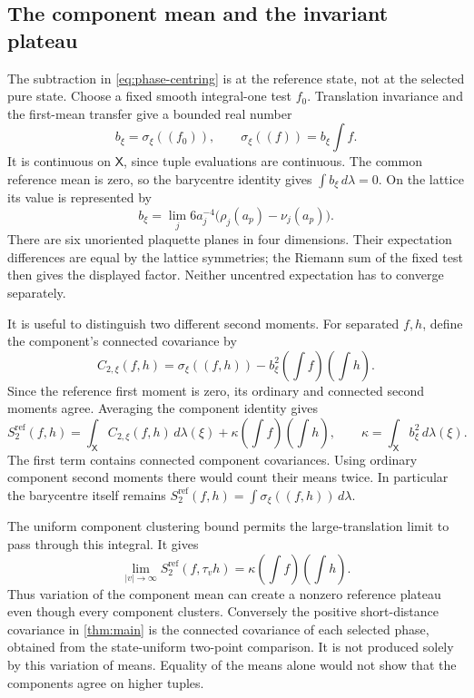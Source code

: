 \documentclass[11pt,letterpaper,reqno]{amsart}
\theoremstyle{definition}
\theoremstyle{remark}
\begin{document}
\subsection{The component mean and the invariant plateau}

The subtraction in \eqref{eq:phase-centring} is at the reference
state, not at the selected pure state. Choose a fixed smooth
integral-one test $f_0$. Translation invariance and the first-mean
transfer give a bounded real number
\[
 b_\xi=\sigma_\xi((f_0)),\qquad
 \sigma_\xi((f))=b_\xi\int f.
\]
It is continuous on $\mathsf X$, since tuple evaluations are
continuous. The common reference mean is zero, so the barycentre
identity gives $\int b_\xi\,d\lambda=0$. On the lattice its value
is represented by
\[
 b_\xi=\lim_j6a_j^{-4}
                  \big(\rho_j(a_p)-\nu_j(a_p)\big).
\]
There are six unoriented plaquette planes in four dimensions. Their
expectation differences are equal by the lattice symmetries; the
Riemann sum of the fixed test then gives the displayed factor.
Neither uncentred expectation has to converge separately.

It is useful to distinguish two different second moments. For
separated $f,h$, define the component's connected covariance by
\[
 C_{2,\xi}(f,h)=\sigma_\xi((f,h))
                      -b_\xi^2\left(\int f\right)\left(\int h\right).
\]
Since the reference first moment is zero, its ordinary and connected
second moments agree. Averaging the component identity gives
\begin{equation}\label{eq:expanded-phase-variance}
 S^{\mathrm{ref}}_2(f,h)
 =\int_{\mathsf X}C_{2,\xi}(f,h)\,d\lambda(\xi)
  +\kappa\left(\int f\right)\left(\int h\right),
 \qquad \kappa=\int_{\mathsf X}b_\xi^2\,d\lambda(\xi).
\end{equation}
The first term contains connected component covariances. Using
ordinary component second moments there would count their means
twice. In particular the barycentre itself remains
$S^{\mathrm{ref}}_2(f,h)=\int\sigma_\xi((f,h))\,d\lambda$.

The uniform component clustering bound permits the large-translation
limit to pass through this integral. It gives
\[
 \lim_{|v|\to\infty}S^{\mathrm{ref}}_2(f,\tau_vh)
       =\kappa\left(\int f\right)\left(\int h\right).
\]
Thus variation of the component mean can create a nonzero reference
plateau even though every component clusters. Conversely the
positive short-distance covariance in \cref{thm:main} is the
connected covariance of each selected phase, obtained from the
state-uniform two-point comparison. It is not produced solely by
this variation of means. Equality of the means alone would not show
that the components agree on higher tuples.
\end{document}
